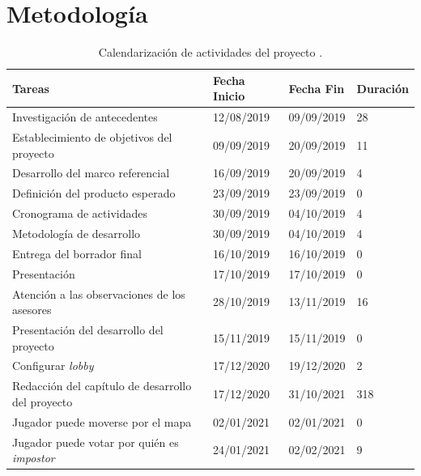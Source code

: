 \section{Metodología}

\begin{longtable}[c]{m{} m{} m{} m{}}
\caption{Calendarización de actividades del proyecto \label{table:fechas_actividades}.} \\
\linespread{0.5}\selectfont\centering
\renewcommand{\arraystretch}{0.75}
 
        Tareas & Fecha Inicio & Fecha Fin & Duración \\ \hline
        Investigación de antecedentes & 12/08/2019 & 09/09/2019 & 28 \\ 
        Establecimiento de objetivos del proyecto & 09/09/2019 & 20/09/2019 & 11 \\ 
        Desarrollo del marco referencial & 16/09/2019 & 20/09/2019 & 4 \\ 
        Definición del producto esperado & 23/09/2019 & 23/09/2019 & 0 \\ 
        Cronograma de actividades & 30/09/2019 & 04/10/2019 & 4 \\
        Metodología de desarrollo & 30/09/2019 & 04/10/2019 & 4 \\
        Entrega del borrador final & 16/10/2019 & 16/10/2019 & 0 \\
        Presentación & 17/10/2019 & 17/10/2019 & 0 \\ 
        Atención a las observaciones de los asesores & 28/10/2019 & 13/11/2019 & 16 \\  
        Presentación del desarrollo del proyecto & 15/11/2019 & 15/11/2019 & 0 \\  
        Configurar \textit{lobby} & 17/12/2020 & 19/12/2020 & 2 \\  
        Redacción del capítulo de desarrollo del proyecto & 17/12/2020 & 31/10/2021 & 318 \\  
        Jugador puede moverse por el mapa & 02/01/2021 & 02/01/2021 & 0 \\  
        Jugador puede votar por quién es \textit{impostor} & 24/01/2021 & 02/02/2021 & 9 \\  

\end{longtable}
